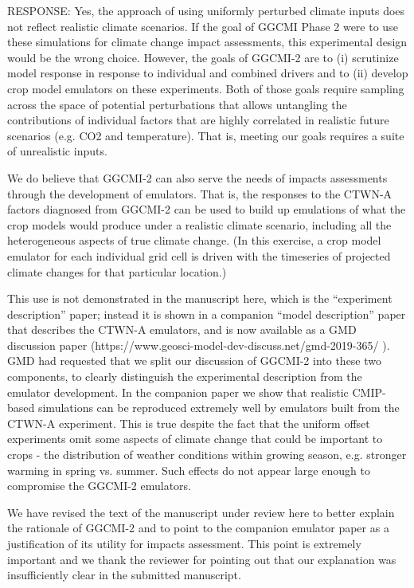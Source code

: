 \documentclass[gmd, manuscript]{copernicus} %
\begin{document}
RESPONSE: Yes, the approach of using uniformly perturbed climate inputs does not reflect realistic climate scenarios. If the goal of GGCMI Phase 2 were to use these simulations for climate change impact assessments, this experimental design would be the wrong choice. However, the goals of GGCMI-2 are to (i) scrutinize model response in response to individual and combined drivers and to (ii) develop crop model emulators on these experiments. Both of those goals require sampling across the space of potential perturbations that allows untangling the contributions of individual factors that are highly correlated in realistic future scenarios (e.g. CO2 and temperature). That is, meeting our goals requires a suite of unrealistic inputs.

We do believe that GGCMI-2 can also serve the needs of impacts assessments through the development of emulators. That is, the responses to the CTWN-A factors diagnosed from GGCMI-2 can be used to build up emulations of what the crop models would produce under a realistic climate scenario, including all the heterogeneous aspects of true climate change. (In this exercise, a crop model emulator for each individual grid cell is driven with the timeseries of projected climate changes for that particular location.) 

This use is not demonstrated in the manuscript here, which is the “experiment description” paper; instead it is shown in a companion “model description” paper that describes the CTWN-A emulators, and is now available as a GMD discussion paper (https://www.geosci-model-dev-discuss.net/gmd-2019-365/ ). GMD had requested that we split our discussion of GGCMI-2 into these two components, to clearly distinguish the experimental description from the emulator development. In the companion paper we show that realistic CMIP-based simulations can be reproduced extremely well by emulators built from the CTWN-A experiment. This is true despite the fact that the uniform offset experiments omit some aspects of climate change that could be important to crops - the distribution of weather conditions within growing season, e.g. stronger warming in spring vs. summer.  Such effects do not appear large enough to compromise the GGCMI-2 emulators. 

We have revised the text of the manuscript under review here to better explain the rationale of GGCMI-2 and to point to the companion emulator paper as a justification of its utility for impacts assessment. This point is extremely important and we thank the reviewer for pointing out that our explanation was insufficiently clear in the submitted manuscript.
\end{document}
